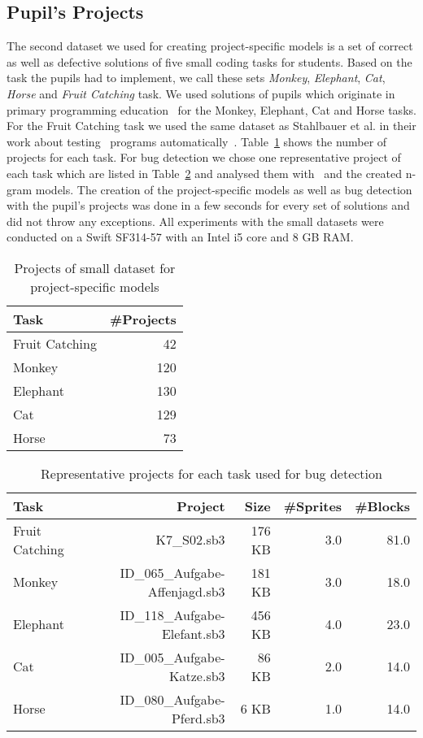 \subsection{Pupil's Projects}\label{subsec:bugset}
The second dataset we used for creating project-specific models is a set of correct as well as defective solutions of five small coding tasks for students. Based on the task the pupils had to implement, we call these sets \textit{Monkey}, \textit{Elephant}, \textit{Cat}, \textit{Horse} and \textit{Fruit Catching} task. We used solutions of pupils which originate in primary programming education~\cite{katharina} for the Monkey, Elephant, Cat and Horse tasks. For the Fruit Catching task we used the same dataset as Stahlbauer et al. in their work about testing \scratch\ programs automatically~\cite{whisker}. Table~\ref{tab:small-dataset} shows the number of projects for each task. For bug detection we chose one representative project of each task which are listed in Table~\ref{tab:buggy-projects} and analysed them with \litterbox\ and the created n-gram models. The creation of the project-specific models as well as bug detection with the pupil's projects was done in a few seconds for every set of solutions and did not throw any exceptions. All experiments with the small datasets were conducted on a Swift SF314-57 with an Intel i5 core and 8 GB RAM.
 
\begin{table}[H]
    \centering
    \caption[Projects of small dataset]{\label{tab:small-dataset}Projects of small dataset for project-specific models}
    \begin{tabular}{lr}
        \toprule
        Task & \#Projects \\
        \midrule
        Fruit Catching & 42 \\
        Monkey & 120 \\
        Elephant & 130 \\
        Cat & 129 \\
        Horse & 73 \\
        \bottomrule
    \end{tabular}
\end{table}

\begin{table}[H]
    \centering
    \caption[Representative projects for each task]{\label{tab:buggy-projects}Representative projects for each task used for bug detection}
    \begin{tabular}{lrrrr}
        \toprule
        Task & Project & Size & \#Sprites & \#Blocks\\
        \midrule
        Fruit Catching & K7\_S02.sb3 & 176 KB & 3.0 & 81.0\\
        Monkey & ID\_065\_Aufgabe-Affenjagd.sb3 & 181 KB & 3.0 & 18.0 \\
        Elephant & ID\_118\_Aufgabe-Elefant.sb3 & 456 KB & 4.0 & 23.0 \\
        Cat & ID\_005\_Aufgabe-Katze.sb3 & 86 KB & 2.0 & 14.0 \\
        Horse & ID\_080\_Aufgabe-Pferd.sb3 & 6 KB & 1.0 & 14.0 \\
        \bottomrule
    \end{tabular}
\end{table}


